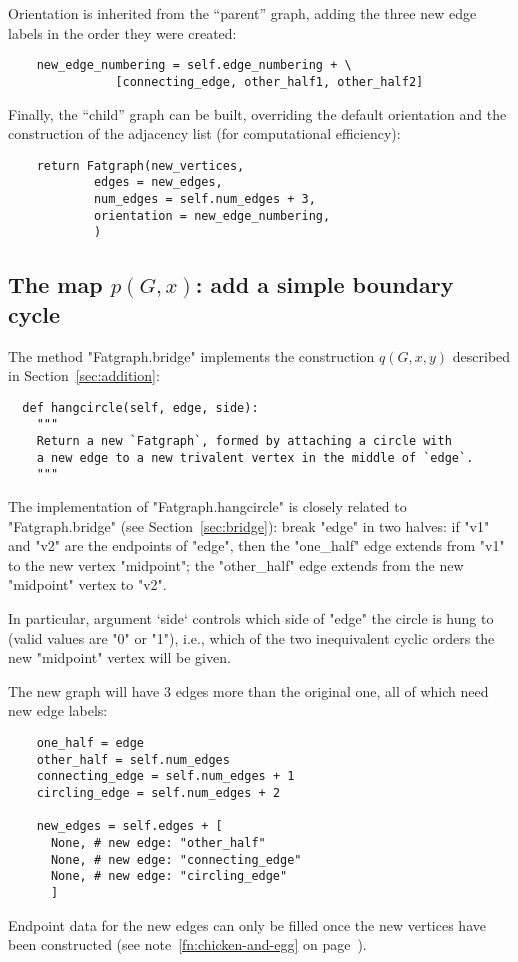 Orientation is inherited from the ``parent'' graph, adding the three
new edge labels in the order they were created:
\begin{lstlisting}
    new_edge_numbering = self.edge_numbering + \
               [connecting_edge, other_half1, other_half2]

\end{lstlisting}
Finally, the ``child'' graph can be built, overriding the default
orientation and the construction of the adjacency list (for
computational efficiency):
\begin{lstlisting}
    return Fatgraph(new_vertices,
            edges = new_edges,
            num_edges = self.num_edges + 3,
            orientation = new_edge_numbering,
            )

\end{lstlisting}


\subsection{The map $p(G,x)$: add a simple boundary cycle}
\label{sec:hangcircle}

The method "Fatgraph.bridge" implements the construction $q(G,x,y)$
described in Section~\ref{sec:addition}:
\begin{lstlisting}
  def hangcircle(self, edge, side):
    """
    Return a new `Fatgraph`, formed by attaching a circle with
    a new edge to a new trivalent vertex in the middle of `edge`.
    """
\end{lstlisting}
The implementation of "Fatgraph.hangcircle" is closely related to
"Fatgraph.bridge" (see Section~\ref{sec:bridge}): break "edge" in two
halves: if "v1" and "v2" are the endpoints of "edge", then the
"one_half" edge extends from "v1" to the new vertex "midpoint"; the
"other_half" edge extends from the new "midpoint" vertex to "v2".

In particular, argument `side` controls which side of "edge" the
circle is hung to (valid values are "0" or "1"), i.e., which of the
two inequivalent cyclic orders the new "midpoint" vertex will be
given.

The new graph will have 3 edges more than the original one, all of
which need new edge labels:
\begin{lstlisting}
    one_half = edge
    other_half = self.num_edges
    connecting_edge = self.num_edges + 1
    circling_edge = self.num_edges + 2
    
    new_edges = self.edges + [
      None, # new edge: "other_half"
      None, # new edge: "connecting_edge"
      None, # new edge: "circling_edge"
      ]
\end{lstlisting}
Endpoint data for the new edges can only be filled once the new
vertices have been constructed (see note~\ref{fn:chicken-and-egg} on
page~\pageref{fn:chicken-and-egg}).%

